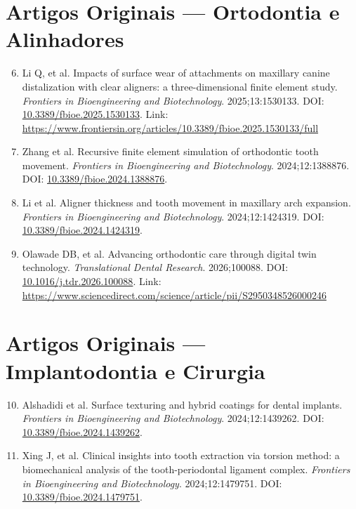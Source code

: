 \section{Artigos Originais — Ortodontia e Alinhadores}

\begin{enumerate}
    \setcounter{enumi}{5}
    \item \label{ref:li2025} Li Q, et al. Impacts of surface wear of attachments on maxillary canine distalization with clear aligners: a three-dimensional finite element study. \textit{Frontiers in Bioengineering and Biotechnology}. 2025;13:1530133. DOI: \href{https://doi.org/10.3389/fbioe.2025.1530133}{10.3389/fbioe.2025.1530133}. Link: \url{https://www.frontiersin.org/articles/10.3389/fbioe.2025.1530133/full}
    
    \item \label{ref:zhang2024} Zhang et al. Recursive finite element simulation of orthodontic tooth movement. \textit{Frontiers in Bioengineering and Biotechnology}. 2024;12:1388876. DOI: \href{https://doi.org/10.3389/fbioe.2024.1388876}{10.3389/fbioe.2024.1388876}.
    
    \item \label{ref:li2024} Li et al. Aligner thickness and tooth movement in maxillary arch expansion. \textit{Frontiers in Bioengineering and Biotechnology}. 2024;12:1424319. DOI: \href{https://doi.org/10.3389/fbioe.2024.1424319}{10.3389/fbioe.2024.1424319}.
    
    \item \label{ref:olawade2026} Olawade DB, et al. Advancing orthodontic care through digital twin technology. \textit{Translational Dental Research}. 2026;100088. DOI: \href{https://doi.org/10.1016/j.tdr.2026.100088}{10.1016/j.tdr.2026.100088}. Link: \url{https://www.sciencedirect.com/science/article/pii/S2950348526000246}
\end{enumerate}

\section{Artigos Originais — Implantodontia e Cirurgia}

\begin{enumerate}
    \setcounter{enumi}{9}
    \item \label{ref:alshadidi2024} Alshadidi et al. Surface texturing and hybrid coatings for dental implants. \textit{Frontiers in Bioengineering and Biotechnology}. 2024;12:1439262. DOI: \href{https://doi.org/10.3389/fbioe.2024.1439262}{10.3389/fbioe.2024.1439262}.
    
    \item \label{ref:xing2024} Xing J, et al. Clinical insights into tooth extraction via torsion method: a biomechanical analysis of the tooth-periodontal ligament complex. \textit{Frontiers in Bioengineering and Biotechnology}. 2024;12:1479751. DOI: \href{https://doi.org/10.3389/fbioe.2024.1479751}{10.3389/fbioe.2024.1479751}.
\end{enumerate}

